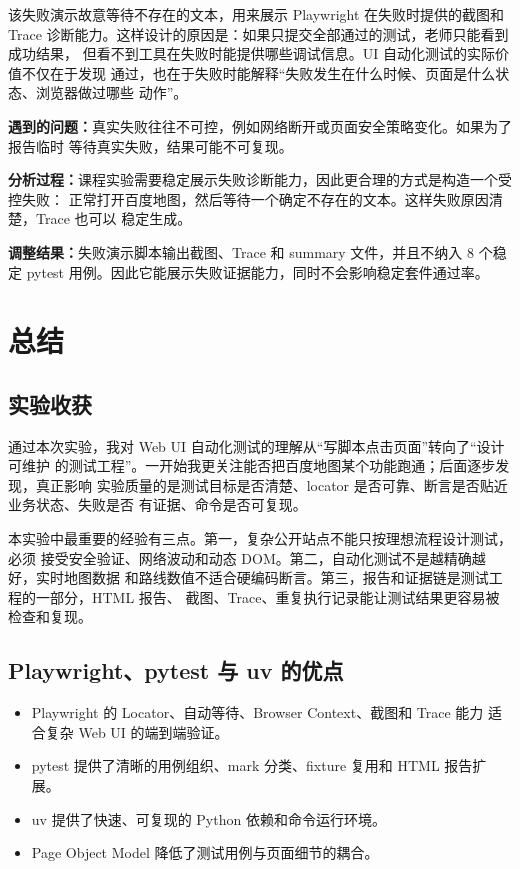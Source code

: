 \documentclass[UTF8,a4paper,12pt]{ctexart}
\newcommand{\problem}[1]{\par\noindent\textbf{遇到的问题：}#1\par}
\newcommand{\analysis}[1]{\par\noindent\textbf{分析过程：}#1\par}
\newcommand{\fix}[1]{\par\noindent\textbf{调整结果：}#1\par}
\begin{document}
该失败演示故意等待不存在的文本，用来展示 Playwright 在失败时提供的截图和 Trace
诊断能力。这样设计的原因是：如果只提交全部通过的测试，老师只能看到成功结果，
但看不到工具在失败时能提供哪些调试信息。UI 自动化测试的实际价值不仅在于发现
通过，也在于失败时能解释“失败发生在什么时候、页面是什么状态、浏览器做过哪些
动作”。

\problem{真实失败往往不可控，例如网络断开或页面安全策略变化。如果为了报告临时
等待真实失败，结果可能不可复现。}

\analysis{课程实验需要稳定展示失败诊断能力，因此更合理的方式是构造一个受控失败：
正常打开百度地图，然后等待一个确定不存在的文本。这样失败原因清楚，Trace 也可以
稳定生成。}

\fix{失败演示脚本输出截图、Trace 和 summary 文件，并且不纳入 8 个稳定 pytest
用例。因此它能展示失败证据能力，同时不会影响稳定套件通过率。}

\section{总结}

\subsection{实验收获}

通过本次实验，我对 Web UI 自动化测试的理解从“写脚本点击页面”转向了“设计可维护
的测试工程”。一开始我更关注能否把百度地图某个功能跑通；后面逐步发现，真正影响
实验质量的是测试目标是否清楚、locator 是否可靠、断言是否贴近业务状态、失败是否
有证据、命令是否可复现。

本实验中最重要的经验有三点。第一，复杂公开站点不能只按理想流程设计测试，必须
接受安全验证、网络波动和动态 DOM。第二，自动化测试不是越精确越好，实时地图数据
和路线数值不适合硬编码断言。第三，报告和证据链是测试工程的一部分，HTML 报告、
截图、Trace、重复执行记录能让测试结果更容易被检查和复现。

\subsection{Playwright、pytest 与 uv 的优点}

\begin{itemize}
  \item Playwright 的 Locator、自动等待、Browser Context、截图和 Trace 能力
  适合复杂 Web UI 的端到端验证。
  \item pytest 提供了清晰的用例组织、mark 分类、fixture 复用和 HTML 报告扩展。
  \item uv 提供了快速、可复现的 Python 依赖和命令运行环境。
  \item Page Object Model 降低了测试用例与页面细节的耦合。
\end{itemize}
\end{document}
